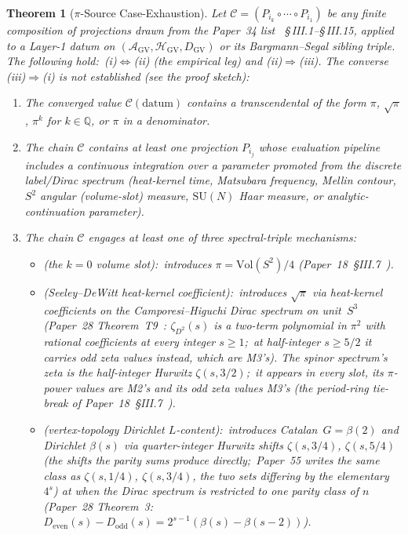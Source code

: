 \documentclass[11pt]{article}
\newtheorem{theorem}{Theorem}
\begin{document}
\begin{theorem}[$\pi$-Source Case-Exhaustion]
\label{thm:pi_source_case_exhaustion}
Let $\mathcal{C} = (P_{i_k} \circ \cdots \circ P_{i_1})$ be any finite
composition of projections drawn from the Paper~34 list~\cite{paper34}
\S\,III.1--\S\,III.15, applied to a Layer-1 datum on
$(\mathcal{A}_{\mathrm{GV}}, \mathcal{H}_{\mathrm{GV}},
D_{\mathrm{GV}})$ or its Bargmann--Segal sibling triple.  The
following hold:\ (i)$\Leftrightarrow$(ii) (the empirical leg) and
(ii)$\Rightarrow$(iii).  The converse (iii)$\Rightarrow$(i) is not
established (see the proof sketch):
\begin{enumerate}
\setlength\itemsep{0pt}
\item[(i)] The converged value $\mathcal{C}(\mathrm{datum})$ contains a
transcendental of the form $\pi$, $\sqrt{\pi}$, $\pi^k$ for $k \in
\mathbb{Q}$, or $\pi$ in a denominator.
\item[(ii)] The chain $\mathcal{C}$ contains at least one projection
$P_{i_j}$ whose evaluation pipeline includes a continuous integration
over a parameter promoted from the discrete label/Dirac spectrum
(heat-kernel time, Matsubara frequency, Mellin contour, $S^2$
angular (volume-slot) measure, $\mathrm{SU}(N)$ Haar measure, or
analytic-continuation parameter).
\item[(iii)] The chain $\mathcal{C}$ engages at least one of three
spectral-triple mechanisms:
\begin{itemize}\setlength\itemsep{0pt}
\item[\textbf{M1}] (the $k = 0$ volume slot):\ introduces $\pi =
\mathrm{Vol}(S^2)/4$ (Paper~18~\S III.7~\cite{paper18}).
\item[\textbf{M2}] (Seeley--DeWitt heat-kernel coefficient):\
introduces $\sqrt{\pi}$ via heat-kernel coefficients on the
Camporesi--Higuchi Dirac spectrum on unit~$S^3$ (Paper~28
Theorem~T9~\cite{paper28}: $\zeta_{D^2}(s)$ is a two-term polynomial
in $\pi^2$ with rational coefficients at every integer $s \ge 1$;\ at
half-integer $s \ge 5/2$ it carries odd zeta values instead, which are
M3's).  The spinor spectrum's zeta is the half-integer Hurwitz
$\zeta(s, 3/2)$;\ it appears in every slot, its $\pi$-power values are
M2's and its odd zeta values M3's (the period-ring tie-break of
Paper~18~\S III.7~\cite{paper18}).
\item[\textbf{M3}] (vertex-topology Dirichlet $L$-content):\
introduces Catalan~$G = \beta(2)$ and Dirichlet $\beta(s)$ via
quarter-integer Hurwitz shifts $\zeta(s, 3/4)$, $\zeta(s, 5/4)$ (the
shifts the parity sums produce directly;\ Paper~55 writes the same class
as $\zeta(s, 1/4)$, $\zeta(s, 3/4)$, the two sets differing by the
elementary $4^{s}$) at
when the Dirac spectrum is restricted to one parity class of $n$
(Paper~28 Theorem~3:\
$D_{\mathrm{even}}(s) - D_{\mathrm{odd}}(s) = 2^{s-1}(\beta(s) -
\beta(s-2))$).
\end{itemize}
\end{enumerate}
\end{theorem}
\end{document}
